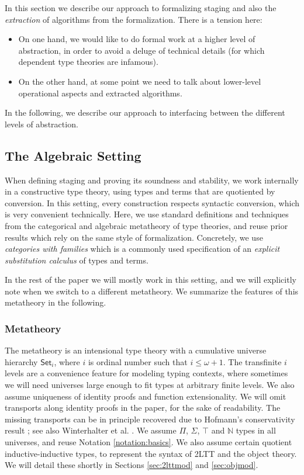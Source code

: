 \documentclass[acmsmall,review]{acmart}
\newcommand{\mbb}[1]{\mathbb{#1}}
\newcommand{\Set}{\mathsf{Set}}
\theoremstyle{remark}
\begin{document}
In this section we describe our approach to formalizing staging and also the
\emph{extraction} of algorithms from the formalization. There is a tension
here:
\begin{itemize}
  \item On one hand, we would like to do formal work at a higher level of
    abstraction, in order to avoid a deluge of technical details (for which
    dependent type theories are infamous).
  \item On the other hand, at some point we need to talk about lower-level
    operational aspects and extracted algorithms.
\end{itemize}
In the following, we describe our approach to interfacing between the different levels
of abstraction.

\subsection{The Algebraic Setting}

When defining staging and proving its soundness and stability, we work
internally in a constructive type theory, using types and terms that are
quotiented by conversion. In this setting, every construction respects syntactic
conversion, which is very convenient technically. Here, we use standard
definitions and techniques from the categorical and algebraic metatheory of type
theories, and reuse prior results which rely on the same style of
formalization. Concretely, we use \emph{categories with families} \cite{cwfs}
which is a commonly used specification of an \emph{explicit substitution
calculus} of types and terms.

In the rest of the paper we will mostly work in this setting, and we will
explicitly note when we switch to a different metatheory. We summarize
the features of this metatheory in the following.

\subsubsection{Metatheory}
The metatheory is an intensional type theory with a cumulative universe
hierarchy $\Set_i$, where $i$ is ordinal number such that $i \leq \omega +
1$. The transfinite $i$ levels are a convenience feature for modeling typing
contexts, where sometimes we will need universes large enough to fit
types at arbitrary finite levels. We also assume uniqueness of identity proofs
and function extensionality. We will omit transports along identity proofs in
the paper, for the sake of readability. The missing transports can be in
principle recovered due to Hofmann's conservativity result
\cite{hofmann95extensional}; see also Winterhalter et
al. \cite{DBLP:conf/cpp/WinterhalterST19}. We assume $\Pi$, $\Sigma$, $\top$ and
$\mbb{N}$ types in all universes, and reuse Notation \ref{notation:basics}. We
also assume certain quotient inductive-inductive types, to represent the syntax of 2LTT
and the object theory. We will detail these shortly in Sections \ref{sec:2lttmod}
and \ref{sec:objmod}.
\end{document}
